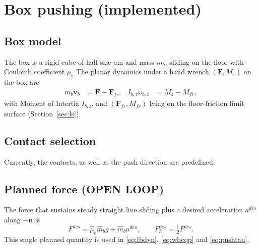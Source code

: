 \documentclass[11pt]{article}
\theoremstyle{remark}
\theoremstyle{definition}
\newcommand{\n}{\bm{n}}
\begin{document}
\section{Box pushing (implemented)}\label{sec:push}
\subsection{Box model}
The box is a rigid cube of half-size $a$m and mass $m_b$, sliding on the floor with Coulomb
coefficient $\mu_b$
The planar dynamics under a hand wrench $(\bm F,M_z)$ on the box are
\begin{align}
  m_b\dot{\bm v}_b&=\bm F-\bm F_{fr}, &
  I_{b,z}\dot\omega_{b,z}&=M_z-M_{fr},
  \label{eq:boxdyn}
\end{align}
with Moment of Intertia $I_{b,z}$, and $(\bm F_{fr},M_{fr})$ lying on the floor-friction limit surface
(Section~\ref{sec:ls}).

\subsection{Contact selection}
Currently, the contacts, as well as the push direction are predefined.

\subsection{Planned force (OPEN LOOP)}
The force that sustains steady straight line sliding plus a desired acceleration $a^{des}$ along $-\n$ is
\begin{equation}
  F^{des}=\hat\mu_b\hat m_b g+\hat m_b a^{des},\qquad F_h^{des}=\tfrac12F^{des}.
\end{equation}
This single planned quantity is used
in \eqref{eq:fbdyn}, \eqref{eq:wbcqp} and \eqref{eq:pushtau}.
\end{document}
